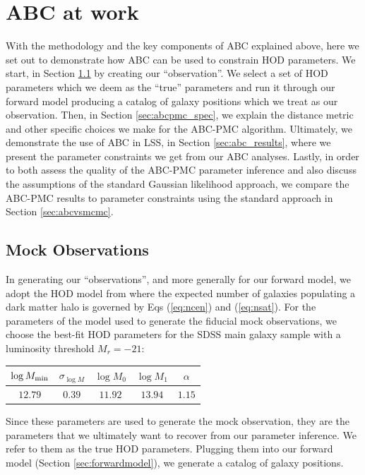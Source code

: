 \section{ABC at work}\label{sec:abcatwork}
With the methodology and the key components of ABC explained above, here we set out to 
demonstrate how ABC can be used to constrain HOD parameters. We start, in Section \ref{sec:mock_obv} 
by creating our ``observation''. We select a set of HOD parameters which we deem as the ``true'' 
parameters and run it through our forward model producing a catalog of galaxy positions 
which we treat as our observation. Then, in Section \ref{sec:abcpmc_spec}, we explain 
the distance metric and other specific choices we make for the ABC-PMC algorithm. 
Ultimately, we demonstrate the use of ABC in LSS, in Section \ref{sec:abc_results},
where we present the parameter constraints we get from our ABC analyses. 
Lastly, in order to both assess the quality of the ABC-PMC parameter inference and also 
discuss the assumptions of the standard Gaussian likelihood approach, we compare the 
ABC-PMC results to parameter constraints using the standard approach in Section 
\ref{sec:abcvsmcmc}.

\subsection{Mock Observations}\label{sec:mock_obv}
In generating our ``observations'', and more generally for our forward model, we adopt 
the HOD model from \cite{zheng07} where the expected number of galaxies populating a 
dark matter halo is governed by Eqs (\ref{eq:ncen}) and (\ref{eq:nsat}). For the parameters 
of the model used to generate the fiducial mock observations, we choose the \cite{zheng07} best-fit HOD parameters for the 
SDSS main galaxy sample with a luminosity threshold $M_{r} = -21$: 
\begin{center}
\renewcommand{\arraystretch}{1.5}
\begin{tabular}{ccccc} \hline \hline 
$\log M_{\rm min}$ & $\sigma_{\log M}$ & $\log M_{0}$ & $\log M_{1}$ & $\alpha$ \\ \hline
$12.79$ & $0.39$ & $11.92$ & $13.94$ & $1.15$ \\ \hline 
\end{tabular} \par
\end{center}
Since these parameters are used to generate the mock observation, they are the parameters
that we ultimately want to recover from our parameter inference. We refer to them as the
true HOD parameters. Plugging them into our forward model (Section \ref{sec:forwardmodel}), 
we generate a catalog of galaxy positions. 

